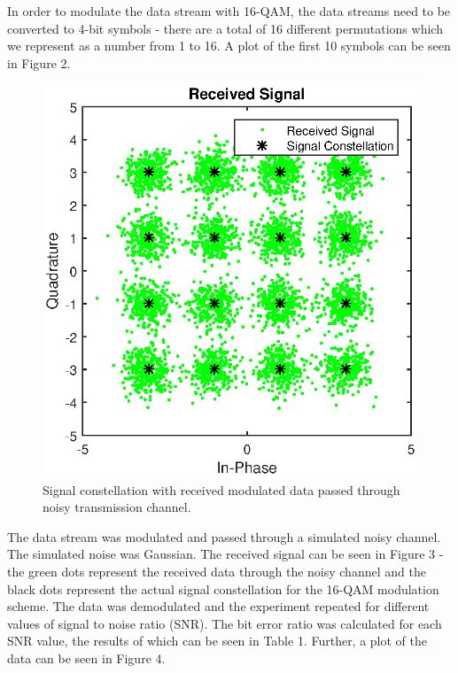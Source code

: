 \documentclass{article}
\begin{document}
In order to modulate the data stream with 16-QAM, the data streams need to be converted to 4-bit symbols - there are a total of 16 different permutations which we represent as a number from 1 to 16. A plot of the first 10 symbols can be seen in Figure 2.  

\begin{figure}[H]
	\centering
	\includegraphics[scale=0.6]{figC}
	\caption{Signal constellation with received modulated data passed through noisy transmission channel.}
\end{figure}

 The data stream was modulated and passed through a simulated noisy channel. The simulated noise was Gaussian. The received signal can be seen in Figure 3 - the green dots represent the received data through the noisy channel and the black dots represent the actual signal constellation for the 16-QAM modulation scheme. The data was demodulated and the experiment repeated for different values of signal to noise ratio (SNR). The bit error ratio was calculated for each SNR value, the results of which can be seen in Table 1. Further, a plot of the data can be seen in Figure 4.
\end{document}
